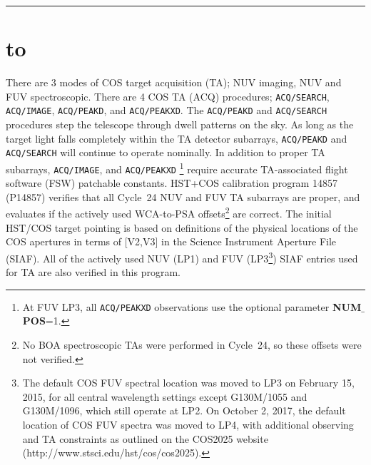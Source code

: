 \documentclass[12pt]{reportj}
\newcommand{\pid}[1]{{\rm P}#1}
\newcommand{\tacq}[1]{\texttt{ACQ/#1}}
\def\numpos{{\bf NUM$\_$POS}\rm}
\def\ssection#1{\addtocounter{section}{1} \setcounter{subsection}{0} \section*{\hbox to \hsize{\large\bf \arabic{section}. #1\hfill }}}
\begin{document}
\vspace{-0.1cm}
\noindent\rule{\linewidth}{1.0pt}
\vspace{-1cm}
\vspace{0.8cm}
\clearpage
\ssection{Introduction}\label{sec:Introduction}
\vspace{-0.3cm}
There are 3 modes of COS target acquisition (TA); NUV imaging, NUV and FUV spectroscopic.
There are 4 COS TA (ACQ) procedures; \tacq{SEARCH}, \tacq{IMAGE}, \tacq{PEAKD}, and \tacq{PEAKXD}.
The \tacq{PEAKD} and \tacq{SEARCH} procedures step the telescope through dwell patterns on the sky. As long as the target light falls completely within
the TA detector subarrays, \tacq{PEAKD} and \tacq{SEARCH} will continue to operate nominally.
In addition to proper TA subarrays, \tacq{IMAGE}, and \tacq{PEAKXD} \footnote{At FUV LP3, all \tacq{PEAKXD} observations use the optional parameter \numpos=1.} require accurate TA-associated flight software (FSW) patchable constants.
HST+COS calibration program 14857 (\pid{14857}) verifies that all Cycle~24 NUV and FUV TA subarrays are proper, and evaluates if the actively used WCA-to-PSA offsets\footnote{No BOA spectroscopic TAs were performed in Cycle~24, so these offsets were not verified.} are correct.
The initial HST/COS target pointing is based on definitions of the physical locations of the COS apertures in terms of [V2,V3] in the Science Instrument Aperture File (SIAF).
All of the actively used NUV (LP1) and FUV (LP3\footnote{The default COS FUV spectral location was moved to LP3 on February 15, 2015, for all central wavelength settings except G130M/1055 and G130M/1096, which still operate at LP2. On October 2, 2017, the default location of COS FUV spectra was moved to LP4, with additional observing and TA constraints as outlined on the COS2025 website (http://www.stsci.edu/hst/cos/cos2025).}) SIAF entries used for TA are also verified in this program.
\end{document}
